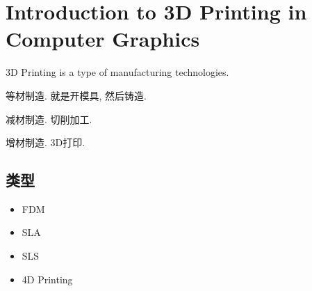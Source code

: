 \newpage
\section{Introduction to 3D Printing in Computer Graphics}
3D Printing is a type of manufacturing technologies.

等材制造. 就是开模具, 然后铸造.

减材制造. 切削加工.

增材制造. 3D打印.

\subsection{类型}
\begin{itemize}
    \item FDM
    \item SLA
    \item SLS
    \item 4D Printing
\end{itemize}
